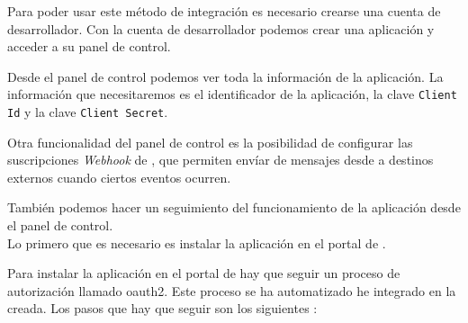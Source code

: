 Para poder usar este método de integración es necesario crearse una cuenta de desarrollador. Con la cuenta de desarrollador podemos crear una aplicación y acceder a su panel de control. 

Desde el panel de control podemos ver toda la información de la aplicación. La información que necesitaremos es el identificador de la aplicación, la clave \texttt{Client Id} y la clave \texttt{Client Secret}.

Otra funcionalidad del panel de control es la posibilidad de configurar las suscripciones \textit{Webhook} de \hs{}, que permiten envíar de mensajes desde \hs{} a destinos externos cuando ciertos eventos ocurren.

También podemos hacer un seguimiento del funcionamiento de la aplicación desde el panel de control. \\

Lo primero que es necesario es instalar la aplicación en el portal de \hs{}.

Para instalar la aplicación en el portal de \hs{} hay que seguir un proceso de autorización llamado \gls{oauth2}. Este proceso se ha automatizado he integrado en la \iface{} creada. 
Los pasos que hay que seguir son los siguientes \cite{hsapi}:

